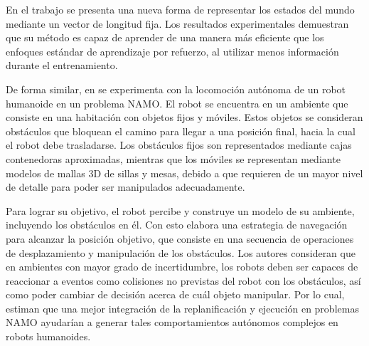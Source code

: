 En el trabajo se presenta una nueva forma de representar los estados del mundo mediante un vector de longitud fija.
Los resultados experimentales demuestran que su método es capaz de aprender de una manera más eficiente que los enfoques estándar de aprendizaje por refuerzo, al utilizar menos información durante el entrenamiento.

De forma similar, en \cite{doi:10.1163/156855307782227408} se experimenta con la locomoción autónoma de un robot humanoide en un problema NAMO.
El robot se encuentra en un ambiente que consiste en una habitación con objetos fijos y móviles.
Estos objetos se consideran obstáculos que bloquean el camino para llegar a una posición final, hacia la cual el robot debe trasladarse.
Los obstáculos fijos son representados mediante cajas contenedoras aproximadas, mientras que los móviles se representan mediante modelos de mallas 3D de sillas y mesas, debido a que requieren de un mayor nivel de detalle para poder ser manipulados adecuadamente.

Para lograr su objetivo, el robot percibe y construye un modelo de su ambiente, incluyendo los obstáculos en él.
Con esto elabora una estrategia de navegación para alcanzar la posición objetivo, que consiste en una secuencia de operaciones de desplazamiento y manipulación de los obstáculos.
Los autores consideran que en ambientes con mayor grado de incertidumbre, los robots deben ser capaces de reaccionar a eventos como colisiones no previstas del robot con los obstáculos, así como poder cambiar de decisión acerca de cuál objeto manipular.
Por lo cual, estiman que una mejor integración de la replanificación y ejecución en problemas NAMO ayudarían a generar tales comportamientos autónomos complejos en robots humanoides.

